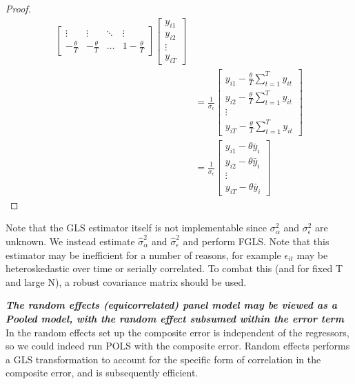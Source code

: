 \documentclass[DIV=14,titlepage=false]{scrreprt}
\begin{document}
\begin{proof}
\begin{align*}
\begin{bmatrix}
            \vdots & \vdots & \ddots & \vdots \\
            -\frac{\theta}{T} & -\frac{\theta}{T} & \ldots & 1-\frac{\theta}{T}
        \end{bmatrix}\begin{bmatrix}
            y_{i1} \\
            y_{i2} \\
            \vdots \\
            y_{iT}
        \end{bmatrix}\\
        &= \frac{1}{\sigma_\epsilon} \begin{bmatrix}
            y_{i1} - \frac{\theta}{T}\sum_{t=1}^T y_{it} \\
            y_{i2} - \frac{\theta}{T}\sum_{t=1}^T y_{it} \\
            \vdots \\
            y_{iT} - \frac{\theta}{T}\sum_{t=1}^T y_{it}
        \end{bmatrix}\\
        &= \frac{1}{\sigma_\epsilon} \begin{bmatrix}
            y_{i1} - \theta \bar{y}_i \\
            y_{i2} - \theta \bar{y}_i \\
            \vdots \\
            y_{iT} - \theta \bar{y}_i
        \end{bmatrix}
    \end{align*}
\end{proof}
Note that the GLS estimator itself is not implementable since $\sigma^2_{\alpha}$ and $\sigma^2_{\epsilon}$ are unknown. We instead estimate $\hat \sigma^2_{\alpha}$ and $\hat \sigma^2_{\epsilon}$ and perform FGLS. Note that this estimator may be inefficient for a number of reasons, for example $\epsilon_{it}$ may be heteroskedastic over time or serially correlated. To combat this (and for fixed T and large N), a robust covariance matrix should be used.
\begin{explanation}
\textit{\textbf{The random effects (equicorrelated) panel model may be viewed as a Pooled model, with the random effect subsumed within the error term}}\\
In the random effects set up the composite error is independent of the regressors, so we could indeed run POLS with the composite error. Random effects performs a GLS transformation to account for the specific form of correlation in the composite error, and is subsequently efficient.
\end{explanation}
\end{document}
